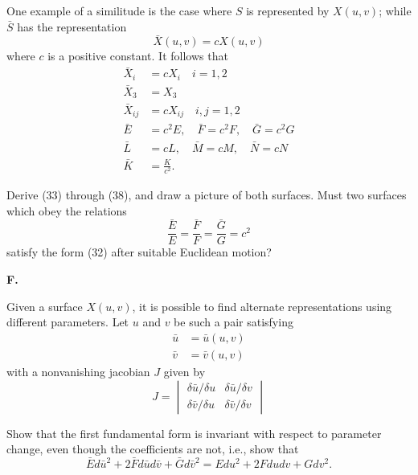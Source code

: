 \documentclass{book}
\begin{document}
One example of a similitude is the case where $S$ is represented by $X(u,v)$; while $\bar{S}$ has the representation
\begin{equation}
\bar{X}(u,v) = cX(u,v)
\end{equation}
where $c$ is a positive constant. It follows that
\begin{align}
\bar{X}_{i} & = cX_{i} \quad i = 1,2 \\
\bar{X}_{3} & = X_{3} \\
\bar{X}_{ij} & = cX_{ij} \quad i,j = 1,2 \\
\bar{E} & = c^{2}E , \quad \bar{F} = c^{2}F , \quad \bar{G} = c^{2}G \\
\bar{L} & = c L , \quad \bar{M} = c M , \quad \bar{N} = c N \\
\bar{K} & = \frac{K}{c^{2}}.
\end{align}

Derive (33) through (38), and draw a picture of both surfaces. Must two surfaces which obey the relations
\begin{equation}
\frac{\bar{E}}{E} = \frac{\bar{F}}{F} = \frac{\bar{G}}{G} = c^{2}
\end{equation}
satisfy the form (32) after suitable Euclidean motion?

\vspace{0.3cm}

\noindent \textbf{F.}

\vspace{0.3cm}

Given a surface $X(u,v)$, it is possible to find alternate representations using different parameters. Let $u$ and $v$ be such a pair satisfying
\begin{align}
\bar{u} & = \bar{u}(u,v) \\
\bar{v} & = \bar{v}(u,v)
\end{align}
with a nonvanishing jacobian $J$ given by
\begin{equation*}
J =
  \begin{vmatrix}
    \delta \bar{u} / \delta u   &   \delta \bar{u} / \delta v \\
    \delta \bar{v} / \delta u   &   \delta \bar{v} / \delta v
  \end{vmatrix}
\end{equation*}

Show that the first fundamental form is invariant with respect to parameter change, even though the coefficients are not, i.e., show that
\begin{equation}
\bar{E} d \bar{u}^{2} + 2 \bar{F} d \bar{u} d \bar{v} + \bar{G} d \bar{v}^{2} = E d u^{2} + 2 F du dv + G d v^{2}.
\end{equation}
\end{document}
